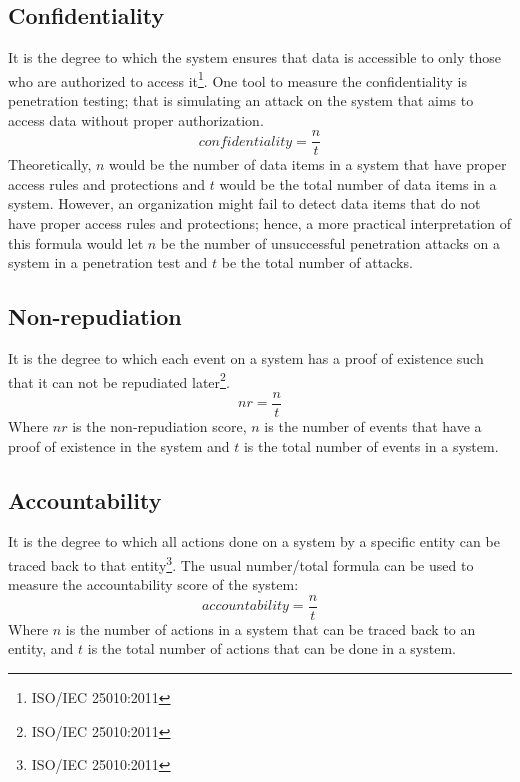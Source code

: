 \documentclass[11pt,a4paper]{article}
\def \iso{\footnote{ISO/IEC 25010:2011}}
\begin{document}
\subsection{Confidentiality}
It is the degree to which the system ensures that data is accessible to only those who are authorized to access it\iso.
One tool to measure the confidentiality is penetration testing;
that is simulating an attack on the system that aims to access data without proper authorization.
\[confidentiality = \frac{n}{t}\]
Theoretically, $n$ would be the number of data items in a system that have proper access rules and protections
and $t$ would be the total number of data items in a system.
However, an organization might fail to detect data items that do not have proper access rules and protections;
hence, a more practical interpretation of this formula would let
$n$ be the number of unsuccessful penetration attacks on a system in a penetration test
and $t$ be the total number of attacks.

\subsection{Non-repudiation}
It is the degree to which each event on a system has a proof of existence such that it can not be repudiated later\iso.
\[nr = \frac{n}{t}\]
Where $nr$ is the non-repudiation score, $n$ is the number of events that have a proof of existence in the system
and $t$ is the total number of events in a system.

\subsection{Accountability}
It is the degree to which all actions done on a system by a specific entity can be traced back to that entity\iso.
The usual number/total formula can be used to measure the accountability score of the system:
\[accountability = \frac{n}{t}\]
Where $n$ is the number of actions in a system that can be traced back to an entity,
and $t$ is the total number of actions that can be done in a system.
\end{document}
